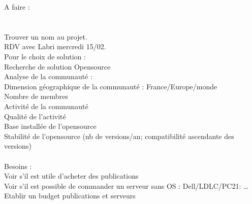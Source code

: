 A faire :\\
\\\\
    Trouver un nom au projet.\\
    RDV avec Labri mercredi 15/02.\\
    Pour le choix de solution  :\\
        Recherche de solution Opensource\\
        Analyse de la communauté :\\
            Dimension géographique de la communauté : France/Europe/monde\\
            Nombre de membres\\
            Activité de la communauté\\
            Qualité de l'activité\\
            Base installée de l'opensource\\
            Stabilité de l'opensource (nb de versions/an; compatibilité ascendante des versions)\\
\\
    Besoins :\\
        Voir s'il est utile d'acheter des publications\\
        Voir s'il est possible de commander un serveur sans OS : Dell/LDLC/PC21: …\\
        Etablir un budget publications et serveurs\\
